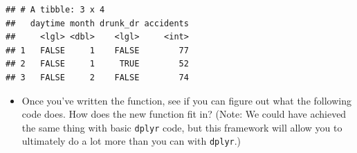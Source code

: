 \documentclass[]{book}
\makeatletter
\newenvironment{Shaded}{\begin{snugshade}}{\end{snugshade}}
\newcommand{\KeywordTok}[1]{\textcolor[rgb]{0.13,0.29,0.53}{\textbf{#1}}}
\newcommand{\DataTypeTok}[1]{\textcolor[rgb]{0.13,0.29,0.53}{#1}}
\newcommand{\DecValTok}[1]{\textcolor[rgb]{0.00,0.00,0.81}{#1}}
\newcommand{\StringTok}[1]{\textcolor[rgb]{0.31,0.60,0.02}{#1}}
\newcommand{\CommentTok}[1]{\textcolor[rgb]{0.56,0.35,0.01}{\textit{#1}}}
\newcommand{\OperatorTok}[1]{\textcolor[rgb]{0.81,0.36,0.00}{\textbf{#1}}}
\newcommand{\NormalTok}[1]{#1}
\providecommand{\tightlist}{%
  \setlength{\itemsep}{0pt}\setlength{\parskip}{0pt}}
\newenvironment{kframe}{%
\medskip{}
\setlength{\fboxsep}{.8em}
 \def\at@end@of@kframe{}%
 \ifinner\ifhmode%
  \def\at@end@of@kframe{\end{minipage}}%
  \begin{minipage}{\columnwidth}%
 \fi\fi%
 \def\FrameCommand##1{\hskip\@totalleftmargin \hskip-\fboxsep
 \colorbox{shadecolor}{##1}\hskip-\fboxsep
     \hskip-\linewidth \hskip-\@totalleftmargin \hskip\columnwidth}%
 \MakeFramed {\advance\hsize-\width
   \@totalleftmargin\z@ \linewidth\hsize
   \@setminipage}}%
 {\par\unskip\endMakeFramed%
 \at@end@of@kframe}
\renewenvironment{Shaded}{\begin{kframe}}{\end{kframe}}
\theoremstyle{definition}
\theoremstyle{definition}
\theoremstyle{definition}
\theoremstyle{remark}
\makeatother
\begin{document}
\begin{Shaded}
\end{Shaded}

\begin{verbatim}
## # A tibble: 3 x 4
##   daytime month drunk_dr accidents
##     <lgl> <dbl>    <lgl>     <int>
## 1   FALSE     1    FALSE        77
## 2   FALSE     1     TRUE        52
## 3   FALSE     2    FALSE        74
\end{verbatim}

\begin{itemize}
\tightlist
\item
  Once you've written the function, see if you can figure out what the
  following code does. How does the new function fit in? (Note: We could
  have achieved the same thing with basic \texttt{dplyr} code, but this
  framework will allow you to ultimately do a lot more than you can with
  \texttt{dplyr}.)
\end{itemize}

\begin{Shaded}
\end{Shaded}
\end{document}
